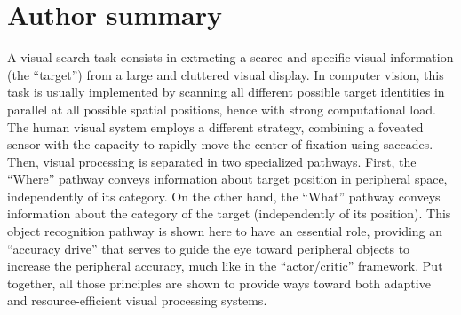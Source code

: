 \documentclass[10pt,a4paper]{article}
\begin{document}
\section*{Author summary}
A visual search task consists in extracting a scarce and specific visual information (the ``target'') from a large and cluttered visual display. In computer vision, this task is usually implemented by scanning all different possible target identities in parallel at all possible spatial positions, hence with strong computational load. The human visual system employs a different strategy, combining a foveated sensor with the capacity to rapidly move the center of fixation using saccades. Then, visual processing is separated in two specialized pathways. First, the ``Where'' pathway conveys information about target position in peripheral space, independently of its category. On the other hand, the ``What'' pathway conveys information about the category of the target (independently of its position). This object recognition pathway is shown here to have an essential role, providing an ``accuracy drive'' that serves to guide the eye toward peripheral objects to increase the peripheral accuracy, much like in the ``actor/critic'' framework. Put together, all those principles are shown to provide ways toward both adaptive and resource-efficient visual processing systems.










\nolinenumbers


\end{document}
